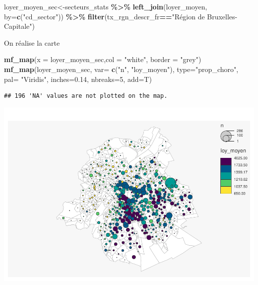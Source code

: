 \documentclass[
]{book}
\newenvironment{Shaded}{\begin{snugshade}}{\end{snugshade}}
\newcommand{\AttributeTok}[1]{\textcolor[rgb]{0.13,0.29,0.53}{#1}}
\newcommand{\DecValTok}[1]{\textcolor[rgb]{0.00,0.00,0.81}{#1}}
\newcommand{\FloatTok}[1]{\textcolor[rgb]{0.00,0.00,0.81}{#1}}
\newcommand{\FunctionTok}[1]{\textcolor[rgb]{0.13,0.29,0.53}{\textbf{#1}}}
\newcommand{\NormalTok}[1]{#1}
\newcommand{\OtherTok}[1]{\textcolor[rgb]{0.56,0.35,0.01}{#1}}
\newcommand{\SpecialCharTok}[1]{\textcolor[rgb]{0.81,0.36,0.00}{\textbf{#1}}}
\newcommand{\StringTok}[1]{\textcolor[rgb]{0.31,0.60,0.02}{#1}}
\begin{document}
\begin{Shaded}
\begin{Highlighting}[]
\NormalTok{loyer\_moyen\_sec}\OtherTok{\textless{}{-}}\NormalTok{secteurs\_stats }\SpecialCharTok{\%\textgreater{}\%}
  \FunctionTok{left\_join}\NormalTok{(loyer\_moyen, }\AttributeTok{by=}\FunctionTok{c}\NormalTok{(}\StringTok{"cd\_sector"}\NormalTok{)) }\SpecialCharTok{\%\textgreater{}\%}
  \FunctionTok{filter}\NormalTok{(tx\_rgn\_descr\_fr}\SpecialCharTok{==}\StringTok{"Région de Bruxelles{-}Capitale"}\NormalTok{)}
\end{Highlighting}
\end{Shaded}

On réalise la carte

\begin{Shaded}
\begin{Highlighting}[]
\FunctionTok{mf\_map}\NormalTok{(}\AttributeTok{x =}\NormalTok{ loyer\_moyen\_sec,}\AttributeTok{col =} \StringTok{"white"}\NormalTok{, }\AttributeTok{border =} \StringTok{"grey"}\NormalTok{)}
\FunctionTok{mf\_map}\NormalTok{(loyer\_moyen\_sec,}
       \AttributeTok{var=} \FunctionTok{c}\NormalTok{(}\StringTok{"n"}\NormalTok{, }\StringTok{"loy\_moyen"}\NormalTok{),}
       \AttributeTok{type=}\StringTok{"prop\_choro"}\NormalTok{,}
       \AttributeTok{pal=} \StringTok{"Viridis"}\NormalTok{,}
       \AttributeTok{inches=}\FloatTok{0.14}\NormalTok{,}
       \AttributeTok{nbreaks=}\DecValTok{5}\NormalTok{,}
       \AttributeTok{add=}\NormalTok{T)}
\end{Highlighting}
\end{Shaded}

\begin{verbatim}
## 196 'NA' values are not plotted on the map.
\end{verbatim}

\includegraphics{bookdown-demo_files/figure-latex/unnamed-chunk-25-1.pdf}
\end{document}
